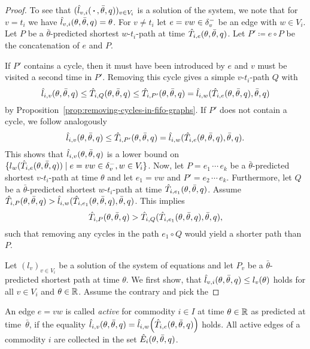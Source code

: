 \begin{proof}
    To see that $(\hat l_{v,i}(\,\boldsymbol{\cdot}\,,\bar\theta, q))_{v\in V_i}$ is a solution of the system, we note that for $v = t_i$ we have $\hat l_{v,i}(\theta, \bar\theta,q) = \theta$.
    For $v\neq t_i$ let $e=vw\in\delta^-_{v}$ be an edge with $w\in V_i$.
    Let $P$ be a $\bar\theta$-predicted shortest $w$-$t_i$-path at time $\hat T_{i,e}(\theta,\bar\theta, q)$.
    Let $P'\coloneqq e\circ P$ be the concatenation of $e$ and $P$.

    If $P'$ contains a cycle, then it must have been introduced by $e$ and $v$ must be visited a second time in $P'$.
    Removing this cycle gives a simple $v$-$t_i$-path $Q$ with 
    \[
        \hat l_{i,v}(\theta,\bar\theta,q) \leq \hat T_{i,Q}(\theta,\bar\theta,q)\leq \hat T_{i,P'}(\theta,\bar\theta,q) = \hat l_{i,w}(\hat T_{i,e}(\theta,\bar\theta, q),\bar\theta,q)
    \]
    by Proposition~\ref{prop:removing-cycles-in-fifo-graphs}.
    If $P'$ does not contain a cycle, we follow analogously
    \[
        \hat l_{i,v}(\theta,\bar\theta,q) \leq \hat T_{i,P'}(\theta,\bar\theta,q) = \hat l_{i,w}(\hat T_{i,e}(\theta,\bar\theta, q),\bar\theta,q).
    \]
    This shows that $\hat l_{i,v}(\theta,\bar\theta,q)$ is a lower bound on $\{ l_w(
        \hat T_{i, e}(\theta, \bar\theta, q)
    ) \mid e=vw\in\delta^-_{v}, w\in V_i  \}$.
    Now, let $P = e_1\, \cdots\, e_k$ be a $\bar\theta$-predicted shortest $v$-$t_i$-path at time $\theta$ and let $e_1=vw$ and $P' = e_2\,\cdots\,e_k$.
    Furthermore, let $Q$ be a $\bar\theta$-predicted shortest $w$-$t_i$-path at time $\hat T_{i,e_1}(\theta,\bar\theta,q)$.
    Assume $\hat T_{i,P}(\theta,\bar\theta, q) > \hat l_{i,w}(\hat T_{i,e_1}(\theta,\bar\theta,q), \bar\theta, q)$.
    This implies
    \[
        \hat T_{i,P}(\theta,\bar\theta, q) > 
        \hat T_{i,Q}(\hat T_{i,e_1}(\theta,\bar\theta,q), \bar\theta, q),
    \]
    such that removing any cycles in the path $e_1\circ Q$ would yield a shorter path than $P$.

    Let $(l_v)_{v\in V_i}$ be a solution of the system of equations and let $P_v$ be a $\bar\theta$-predicted shortest path at time $\theta$.
    We first show, that $\hat l_{v,i}(\theta,\bar\theta, q)\leq l_v(\theta)$ holds for all $v\in V_i$ and $\theta\in\mathbb{R}$.
    Assume the contrary and pick the 
\end{proof}

An edge $e=vw$ is called \emph{active} for commodity $i\in I$ at time $\theta\in\mathbb{R}$ as predicted at time~$\bar\theta$, if the equality $\hat l_{i,v}(\theta, \bar\theta, q) = \hat l_{i,w}{\left(
        \hat T_{i, e}(\theta, \bar\theta, q)
    \right)}$ holds.
All active edges of a commodity $i$ are collected in the set $\hat E_i(\theta, \bar\theta, q)$. 

